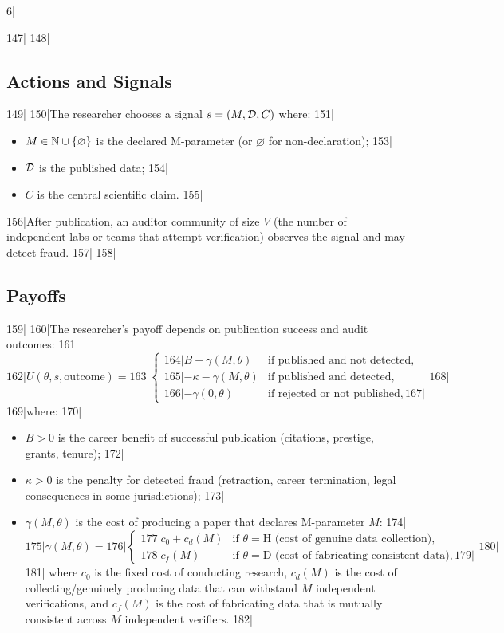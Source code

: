 6|\documentclass[12pt,a4paper]{article}
\begin{document}
147|
148|\subsection{Actions and Signals }
149|
150|The researcher chooses a signal $s = (M, \mathcal{D}, C)$ where:
151|\begin{itemize}[nosep]
152|    \item $M \in \mathbb{N} \cup \{\varnothing\}$ is the declared M-parameter (or $\varnothing$ for non-declaration);
153|    \item $\mathcal{D}$ is the published data;
154|    \item $C$ is the central scientific claim.
155|\end{itemize}
156|After publication, an auditor community of size $V$ (the number of independent labs or teams that attempt verification) observes the signal and may detect fraud.
157|
158|\subsection{Payoffs }
159|
160|The researcher's payoff depends on publication success and audit outcomes:
161|\begin{equation}\label{eq:payoff}
162|    U(\theta, s, \text{outcome}) =
163|    \begin{cases}
164|        B - \gamma(M, \theta) & \text{if published and not detected}, \\
165|        -\kappa - \gamma(M, \theta) & \text{if published and detected}, \\
166|        -\gamma(0, \theta) & \text{if rejected or not published},
167|    \end{cases}
168|\end{equation}
169|where:
170|\begin{itemize}[nosep]
171|    \item $B > 0$ is the career benefit of successful publication (citations, prestige, grants, tenure);
172|    \item $\kappa > 0$ is the penalty for detected fraud (retraction, career termination, legal consequences in some jurisdictions);
173|    \item $\gamma(M, \theta)$ is the cost of producing a paper that declares M-parameter $M$:
174|    \begin{equation}\label{eq:cost}
175|        \gamma(M, \theta) =
176|        \begin{cases}
177|            c_0 + c_d(M) & \text{if } \theta = \text{H (cost of genuine data collection)}, \\
178|            c_f(M) & \text{if } \theta = \text{D (cost of fabricating consistent data)},
179|        \end{cases}
180|    \end{equation}
181|    where $c_0$ is the fixed cost of conducting research, $c_d(M)$ is the cost of collecting/genuinely producing data that can withstand $M$ independent verifications, and $c_f(M)$ is the cost of fabricating data that is mutually consistent across $M$ independent verifiers.
182|\end{itemize}
\end{document}
